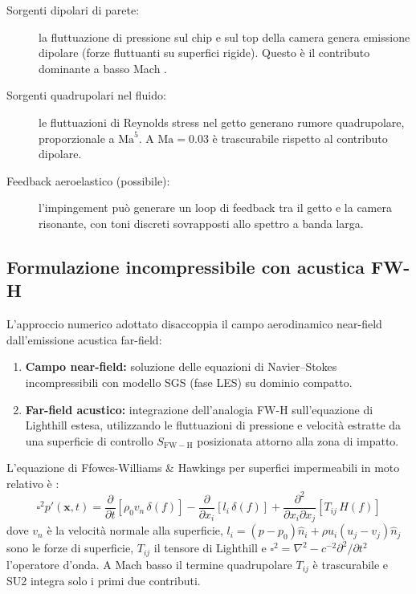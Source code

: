 \documentclass[11pt,a4paper]{article}
\newcommand{\Ma}{\mathrm{Ma}}
\begin{document}
\begin{description}
  \item[Sorgenti dipolari di parete:] la fluttuazione di pressione sul chip e sul top della camera genera emissione dipolare (forze fluttuanti su superfici rigide). Questo è il contributo dominante a basso Mach \cite{FfowcsHawkings1969}.
  \item[Sorgenti quadrupolari nel fluido:] le fluttuazioni di Reynolds stress nel getto generano rumore quadrupolare, proporzionale a $\Ma^5$. A $\Ma = 0.03$ è trascurabile rispetto al contributo dipolare.
  \item[Feedback aeroelastico (possibile):] l'impingement può generare un loop di feedback tra il getto e la camera risonante, con toni discreti sovrapposti allo spettro a banda larga.
\end{description}

\subsection{Formulazione incompressibile con acustica FW-H}

L'approccio numerico adottato disaccoppia il campo aerodinamico near-field dall'emissione acustica far-field:

\begin{enumerate}
  \item \textbf{Campo near-field:} soluzione delle equazioni di Navier--Stokes incompressibili con modello SGS (fase LES) su dominio compatto.
  \item \textbf{Far-field acustico:} integrazione dell'analogia FW-H sull'equazione di Lighthill estesa, utilizzando le fluttuazioni di pressione e velocità estratte da una superficie di controllo $S_{\mathrm{FW-H}}$ posizionata attorno alla zona di impatto.
\end{enumerate}

L'equazione di Ffowcs-Williams \& Hawkings per superfici impermeabili in moto relativo è \cite{FfowcsHawkings1969}:
\begin{equation}
  \square^2 p'(\mathbf{x},t) =
  \frac{\partial}{\partial t}\left[\rho_0 v_n\, \delta(f)\right]
  - \frac{\partial}{\partial x_i}\left[l_i\, \delta(f)\right]
  + \frac{\partial^2}{\partial x_i\partial x_j}\left[T_{ij}\, H(f)\right]
\end{equation}
dove $v_n$ è la velocità normale alla superficie, $l_i = (p - p_0)\hat{n}_i + \rho u_i(u_j-v_j)\hat{n}_j$ sono le forze di superficie, $T_{ij}$ il tensore di Lighthill e $\square^2 = \nabla^2 - c^{-2}\partial^2/\partial t^2$ l'operatore d'onda. A Mach basso il termine quadrupolare $T_{ij}$ è trascurabile e SU2 integra solo i primi due contributi.
\end{document}
